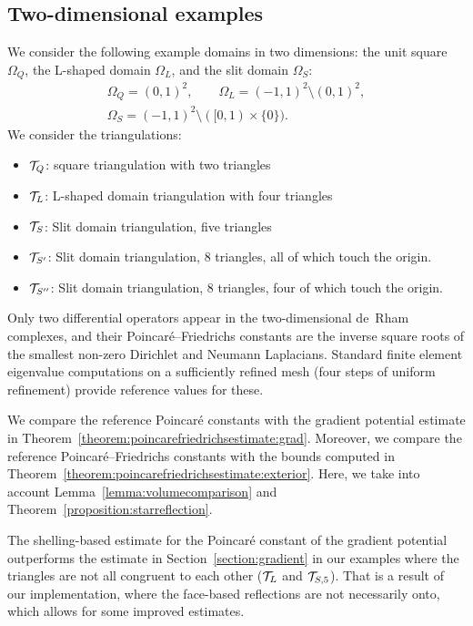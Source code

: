 \documentclass[10pt,a4paper]{article}
\begin{document}
    



\subsection{Two-dimensional examples}

We consider the following example domains in two dimensions:
the unit square $\Omega_Q$, the L-shaped domain $\Omega_L$, and the slit domain $\Omega_{S}$:
\begin{gather*}
    \Omega_{Q} = ( 0,1)^2,
    \qquad 
    \Omega_{L} = (-1,1)^2 \setminus (0,1)^2,
    \\
    \Omega_{S} = (-1,1)^2 \setminus ( [0,1) \times \{0\} ).
\end{gather*}
We consider the triangulations: 
\begin{itemize}
    \item ${\mathcal T}_{Q}$:  square triangulation with two triangles
    \item ${\mathcal T}_{L}$:  L-shaped domain triangulation with four triangles
    \item ${\mathcal T}_{S}$:  Slit domain triangulation, five triangles 
    \item ${\mathcal T}_{S'}$: Slit domain triangulation, 8 triangles, all of which touch the origin.
    \item ${\mathcal T}_{S''}$: Slit domain triangulation, 8 triangles, four of which touch the origin.
\end{itemize}

Only two differential operators appear in the two-dimensional de~Rham complexes,
and their Poincar\'e--Friedrichs constants are the inverse square roots of the smallest non-zero Dirichlet and Neumann Laplacians. 
Standard finite element eigenvalue computations on a sufficiently refined mesh (four steps of uniform refinement) provide reference values for these.

We compare the reference Poincar\'e constants with the gradient potential estimate in Theorem~\ref{theorem:poincarefriedrichsestimate:grad}.
%
Moreover, we compare the reference Poincar\'e--Friedrichs constants with the bounds computed in Theorem~\ref{theorem:poincarefriedrichsestimate:exterior}. Here, we take into account Lemma~\ref{lemma:volumecomparison} and Theorem~\ref{proposition:starreflection}.

The shelling-based estimate for the Poincar\'e constant of the gradient potential outperforms the estimate in Section~\ref{section:gradient} in our examples where the triangles are not all congruent to each other (${\mathcal T}_{L}$ and ${\mathcal T}_{S,5}$).
That is a result of our implementation, where the face-based reflections are not necessarily onto, which allows for some improved estimates.
\end{document}
